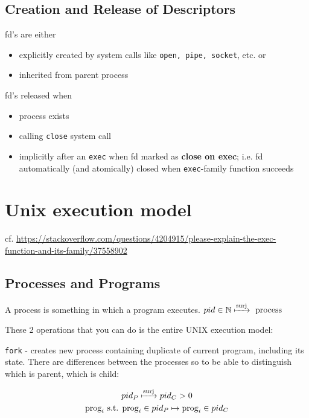 \documentclass[10pt]{amsart}
\begin{document}
\subsection{Creation and Release of Descriptors}

fd's are either 
\begin{itemize}
	\item explicitly created by system calls like \texttt{open, pipe, socket}, etc. or 
	\item inherited from parent process
\end{itemize}

fd's released when
\begin{itemize}
	\item process exists
	\item calling \texttt{close} system call
	\item implicitly after an \texttt{exec} when fd marked as \textbf{close on exec}; i.e. fd automatically (and atomically) closed when \texttt{exec}-family function succeeds
\end{itemize}

\section{Unix execution model}

cf. \url{https://stackoverflow.com/questions/4204915/please-explain-the-exec-function-and-its-family/37558902}

\subsection{Processes and Programs}

A process is something in which a program executes. $pid \in \mathbb{N} \xmapsto{\text{surj}} \text{ process }$

These 2 operations that you can do is the entire UNIX execution model:

\texttt{fork} - creates new process containing duplicate of current program, including its state. There are differences between the processes so to be able to distinguish which is parent, which is child:

\[
\begin{gathered}
pid_P \xmapsto{\text{surj}} pid_C > 0 \\
\text{prog}_i \text{ s.t. } \text{prog}_i \in pid_P \mapsto \text{prog}_i \in pid_C 
\end{gathered}
\]
\end{document}
